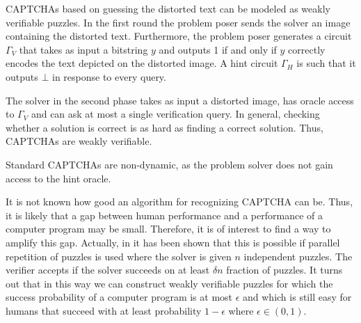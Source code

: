 
CAPTCHAs based on guessing the distorted text can be modeled as weakly verifiable puzzles.
In the first round the problem poser sends the solver an image containing the distorted text.
Furthermore, the problem poser generates a circuit $\Gamma_V$ that takes as input a bitstring $y$
and outputs 1 if and only if $y$ correctly encodes the text depicted on the distorted image.
A hint circuit $\Gamma_H$ is such that it outputs $\bot$ in response to every query.

The solver in the second phase takes as input a distorted image, has oracle access to $\Gamma_V$ and can ask at most a single verification query.
In general, checking whether a solution is correct is as hard as finding a correct solution. Thus, CAPTCHAs are weakly verifiable.

Standard CAPTCHAs are non-dynamic, as the problem solver does not gain access to the hint oracle.

It is not known how good an algorithm for recognizing CAPTCHA can be. Thus, it is likely that a gap between human
performance and a performance of a computer program may be small. Therefore, it is of interest to find a way to amplify this gap.
Actually, in \cite{DBLP:journals/corr/abs-1002-3534} it has been shown that this is possible if parallel repetition of puzzles is used where
the solver is given $n$ independent puzzles. The verifier accepts if the solver succeeds on at least $\delta n$ fraction of puzzles.
It turns out that in this way we can construct weakly verifiable puzzles for which the success probability of a computer program is at most $\epsilon$ and
which is still easy for humans that succeed with at least probability $1 - \epsilon$ where $\epsilon \in (0,1)$.


